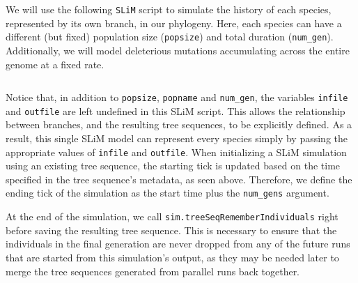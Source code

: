 \documentclass[12pt]{article}
\newcommand{\slim}[0]{\texttt{SLiM}\xspace}
\begin{document}
We will use the following \slim script to simulate the history of each species, represented by its own branch, in our phylogeny. Here, each species can have a different
(but fixed) population size (\verb|popsize|) and total duration (\verb|num_gen|). Additionally, we will model deleterious mutations accumulating across the entire genome at a fixed rate.
%
\inputminted[breaklines, breakautoindent=true, breakanywhere=true, fontsize=\small, linenos, bgcolor=gray!10]{slim}{code/parallelizing_phylogeny/simulate_branch.slim}
%
Notice that, in addition to \verb|popsize|, \verb|popname| and \verb|num_gen|, the variables \verb|infile| and \verb|outfile| are left undefined in this SLiM script.
This allows the relationship between branches, and the
resulting tree sequences, to be explicitly defined. As a result, this single SLiM model can represent every species simply by passing the appropriate values of \verb|infile| and \verb|outfile|.
When initializing a SLiM simulation using an existing tree sequence, the starting tick is updated
based on the time specified in the tree sequence's metadata, as seen above.
Therefore, we define the ending tick of the simulation as the start time plus the \verb|num_gens| argument.


At the end of the simulation, we call \verb|sim.treeSeqRememberIndividuals| right before saving the resulting tree sequence.
This is necessary to ensure that the individuals in the final generation are never dropped from any of the future runs that are started from this simulation's output,
as they may be needed later to merge the tree sequences generated from parallel runs back together.
\end{document}
